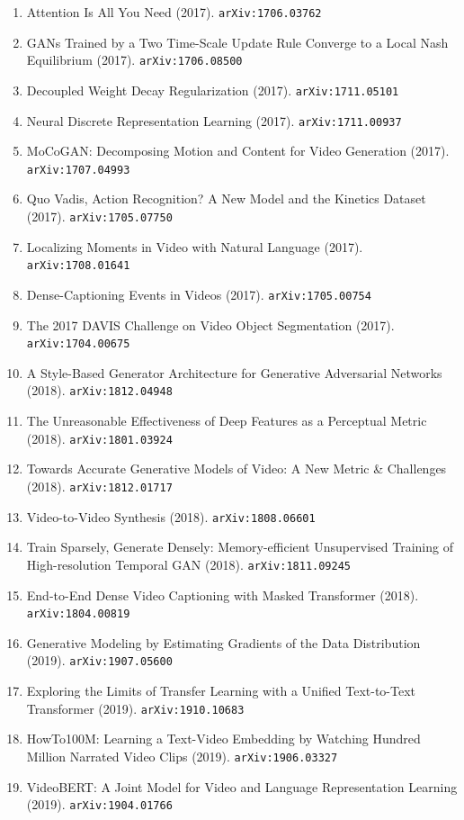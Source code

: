 \documentclass[11pt]{article}
\begin{document}
\begin{enumerate}
  \item Attention Is All You Need (2017). \texttt{arXiv:1706.03762}
  \item GANs Trained by a Two Time-Scale Update Rule Converge to a Local Nash
  Equilibrium (2017). \texttt{arXiv:1706.08500}
  \item Decoupled Weight Decay Regularization (2017). \texttt{arXiv:1711.05101}
  \item Neural Discrete Representation Learning (2017). \texttt{arXiv:1711.00937}
  \item MoCoGAN: Decomposing Motion and Content for Video Generation (2017). \texttt{arXiv:1707.04993}
  \item Quo Vadis, Action Recognition? A New Model and the Kinetics Dataset (2017). \texttt{arXiv:1705.07750}
  \item Localizing Moments in Video with Natural Language (2017). \texttt{arXiv:1708.01641}
  \item Dense-Captioning Events in Videos (2017). \texttt{arXiv:1705.00754}
  \item The 2017 DAVIS Challenge on Video Object Segmentation (2017). \texttt{arXiv:1704.00675}
  \item A Style-Based Generator Architecture for Generative Adversarial Networks (2018). \texttt{arXiv:1812.04948}
  \item The Unreasonable Effectiveness of Deep Features as a Perceptual Metric (2018). \texttt{arXiv:1801.03924}
  \item Towards Accurate Generative Models of Video: A New Metric \& Challenges (2018). \texttt{arXiv:1812.01717}
  \item Video-to-Video Synthesis (2018). \texttt{arXiv:1808.06601}
  \item Train Sparsely, Generate Densely: Memory-efficient Unsupervised Training
  of High-resolution Temporal GAN (2018). \texttt{arXiv:1811.09245}
  \item End-to-End Dense Video Captioning with Masked Transformer (2018). \texttt{arXiv:1804.00819}
  \item Generative Modeling by Estimating Gradients of the Data Distribution (2019). \texttt{arXiv:1907.05600}
  \item Exploring the Limits of Transfer Learning with a Unified Text-to-Text
  Transformer (2019). \texttt{arXiv:1910.10683}
  \item HowTo100M: Learning a Text-Video Embedding by Watching Hundred Million
  Narrated Video Clips (2019). \texttt{arXiv:1906.03327}
  \item VideoBERT: A Joint Model for Video and Language Representation Learning (2019). \texttt{arXiv:1904.01766}

\end{enumerate}
\end{document}
